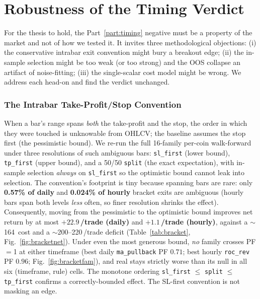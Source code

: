 \documentclass[12pt]{article}
\newcommand{\bp}{\,\text{bp}}
\begin{document}
\part{Robustness of the Timing Verdict}\label{part:robust}
\noindent For the thesis to hold, the Part~\ref{part:timing} negative must be a property of the market and not of how we tested it. It invites three methodological objections: (i) the conservative intrabar exit convention might bury a breakout edge; (ii) the in-sample selection might be too weak (or too strong) and the OOS collapse an artifact of noise-fitting; (iii) the single-scalar cost model might be wrong. We address each head-on and find the verdict unchanged.

\section{The Intrabar Take-Profit/Stop Convention}\label{sec:bracket}
When a bar's range spans \emph{both} the take-profit and the stop, the order in which they were touched is unknowable from OHLCV; the baseline assumes the stop first (the pessimistic bound). We re-run the full 16-family per-coin walk-forward under three resolutions of such ambiguous bars: \texttt{sl\_first} (lower bound), \texttt{tp\_first} (upper bound), and a 50/50 \texttt{split} (the exact expectation), with in-sample selection \emph{always} on \texttt{sl\_first} so the optimistic bound cannot leak into selection. The convention's footprint is tiny because spanning bars are rare: only \textbf{0.57\% of daily} and \textbf{0.024\% of hourly} bracket exits are ambiguous (hourly bars span both levels \emph{less} often, so finer resolution shrinks the effect). Consequently, moving from the pessimistic to the optimistic bound improves net return by at most \textbf{$+22.9$\bp/trade (daily)} and \textbf{$+1.1$\bp/trade (hourly)}, against a $\sim$164\bp{} cost and a $\sim$200--220\bp/trade deficit (Table~\ref{tab:bracket}, Fig.~\ref{fig:bracketnet}). Under even the most generous bound, \emph{no} family crosses PF$=$1 at either timeframe (best daily \texttt{ma\_pullback} PF $0.71$; best hourly \texttt{roc\_rev} PF $0.96$; Fig.~\ref{fig:bracketfam}), and real stays strictly worse than its null in all six (timeframe, rule) cells. The monotone ordering \texttt{sl\_first} $\leq$ \texttt{split} $\leq$ \texttt{tp\_first} confirms a correctly-bounded effect. The SL-first convention is not masking an edge.
\end{document}
